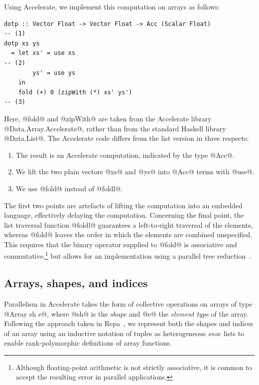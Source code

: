 Using Accelerate, we implement this computation on arrays as follows:
%
\begin{lstlisting}[style=haskell]
dotp :: Vector Float -> Vector Float -> Acc (Scalar Float)                         -- (1)
dotp xs ys
  = let xs' = use xs                                                               -- (2)
        ys' = use ys
    in
    fold (+) 0 (zipWith (*) xs' ys')                                               -- (3)
\end{lstlisting}
%
Here, @fold@ and @zipWith@ are taken from the Accelerate library
@Data.Array.Accelerate@, rather than from the standard Haskell library
@Data.List@. The Accelerate code differs from the list version in three
respects:
%
\begin{enumerate}
    \item The result is an Accelerate computation, indicated by the type @Acc@.
    \item We lift the two plain vectors @xs@ and @ys@ into @Acc@ terms with @use@.
    \item We use @fold@ instead of @foldl@.
\end{enumerate}
%
The first two points are artefacts of lifting the computation into an embedded
language, effectively delaying the computation. Concerning the final point, the
list traversal function @foldl@ guarantees a left-to-right traversal of the
elements, whereas @fold@ leaves the order in which the elements are combined
unspecified. This requires that the binary operator supplied to @fold@ is
associative and commutative,\footnote{Although floating-point arithmetic is not
strictly associative, it is common to accept the resulting error in parallel
applications.} but allows for an implementation using a parallel tree
reduction~\cite{Chatterjee:1990vj,Sengupta:2007tc}.


\subsection{Arrays, shapes, and indices}
\label{sec:arrays_shapes_and_indices}

Parallelism in Accelerate takes the form of collective operations on arrays of
type @Array sh e@, where @sh@ is the \emph{shape} and @e@ the \emph{element
type} of the array. Following the approach taken in Repa~\cite{Keller:2010er},
we represent both the shapes and indices of an array using an inductive notation
of tuples as heterogeneous \emph{snoc} lists to enable rank-polymorphic
definitions of array functions.

